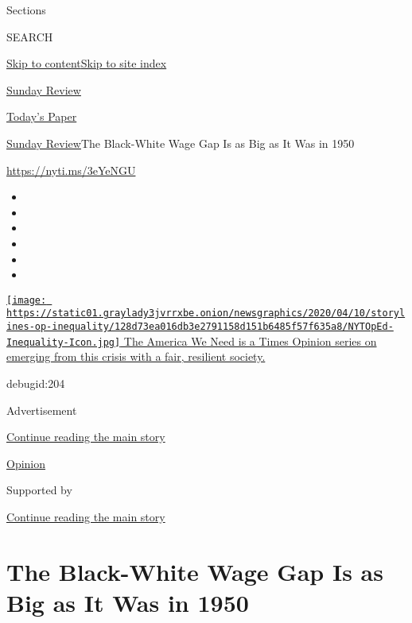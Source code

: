 Sections

SEARCH

\protect\hyperlink{site-content}{Skip to
content}\protect\hyperlink{site-index}{Skip to site index}

\href{https://www.nytimes3xbfgragh.onion/section/opinion/sunday}{Sunday
Review}

\href{https://myaccount.nytimes3xbfgragh.onion/auth/login?response_type=cookie\&client_id=vi}{}

\href{https://www.nytimes3xbfgragh.onion/section/todayspaper}{Today's
Paper}

\href{/section/opinion/sunday}{Sunday Review}\textbar{}The Black-White
Wage Gap Is as Big as It Was in 1950

\url{https://nyti.ms/3eYeNGU}

\begin{itemize}
\item
\item
\item
\item
\item
\item
\end{itemize}

\href{https://www.nytimes3xbfgragh.onion/interactive/2020/opinion/america-inequality-coronavirus.html?action=click\&pgtype=Article\&state=default\&region=TOP_BANNER\&context=storylines_menu}{\texttt{[image: https://static01.graylady3jvrrxbe.onion/newsgraphics/2020/04/10/storylines-op-inequality/128d73ea016db3e2791158d151b6485f57f635a8/NYTOpEd-Inequality-Icon.jpg]}
The America We Need is a Times Opinion series on emerging from this
crisis with a fair, resilient society. }

debugid:204

Advertisement

\protect\hyperlink{after-top}{Continue reading the main story}

\href{/section/opinion}{Opinion}

Supported by

\protect\hyperlink{after-sponsor}{Continue reading the main story}

\hypertarget{the-black-white-wage-gap-is-as-big-as-it-was-in-1950}{%
\section{The Black-White Wage Gap Is as Big as It Was in
1950}\label{the-black-white-wage-gap-is-as-big-as-it-was-in-1950}}

